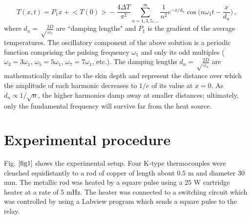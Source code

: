 \documentclass[12pt,a4]{article}
\begin{document}
\begin{equation}
T(x,t)=P_1x+\Big<T(0)\Big>-{\frac{4{\Delta}T}{\pi^2}}\sum_{n=1,3,5,...}^{\infty}\frac{1}{n^2}e^{-x/d_n}\cos\Bigg(n\omega_1t-\frac{x}{d_n} \Bigg)\, , \label{eq5}
\end{equation}
where $d_n=\sqrt\frac{2D}{\omega_n}$ are ``damping lengths" and $P_1$ is the gradient of the average temperatures. The oscillatory component of the above solution is a periodic function comprising the pulsing frequency $\omega_1$ and only its odd multiples ($\omega_3=3\omega_1$, $\omega_5=5\omega_1$, $\omega_7=7\omega_1$, etc.). The damping lengths $d_n=\sqrt\frac{2D}{\omega_n}$ are mathematically similar to the skin depth and represent the distance over which the amplitude of each harmonic decreases to $1/e$ of its value at $x=0$. As $d_n\propto1/\sqrt{n}$, the higher harmonics damp away at smaller distances; ultimately, only the fundamental frequency will survive far from the heat source.

\section{Experimental procedure}


Fig. $\ref{fig1}$ shows the experimental setup. Four K-type thermocouples were clenched equidistantly to a rod of copper of length about $0.5$ m and diameter $30$ mm. The metallic rod was heated by a square pulse using a $25$ W cartridge heater at a rate of $5$ mHz. The heater was connected to a switching circuit which was controlled by using a Labview program which sends a square pulse to the relay.
\end{document}
